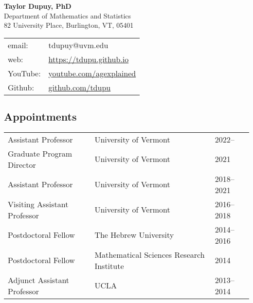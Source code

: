 \documentclass[a4paper,10pt]{article}
\begin{document}

\begin{multicols}{2}
\begin{flushleft}
    {\Large \bf Taylor Dupuy, PhD}\\
	Department of Mathematics and Statistics \\
	82 University Place, Burlington, VT, 05401  
	\newline \newline
	\begin{tabular}{ll}
		email: & tdupuy@uvm.edu\\
		web: & \url{https://tdupu.github.io}\\
		YouTube: & \url{youtube.com/agexplained} \\
		Github: & \url{github.com/tdupu} 
	\end{tabular}
\end{flushleft}
\end{multicols}

 
 
 \subsection*{Appointments}
 \vspace*{-10pt}
\begin{center}
\begin{tabular}{p{1.7in} p{3.5in}p{1in}}
Assistant Professor & University of Vermont & 2022--\\
Graduate Program Director & University of Vermont & 2021 \\
Assistant Professor & University of Vermont & 2018--2021 \\
Visiting Assistant Professor & University of Vermont & 2016--2018 \\
Postdoctoral Fellow & The Hebrew University& 2014--2016 \\
Postdoctoral Fellow & Mathematical Sciences Research Institute & 2014 \\
Adjunct Assistant Professor & UCLA & 2013--2014 \\
\end{tabular}
\end{center}
\end{document}
